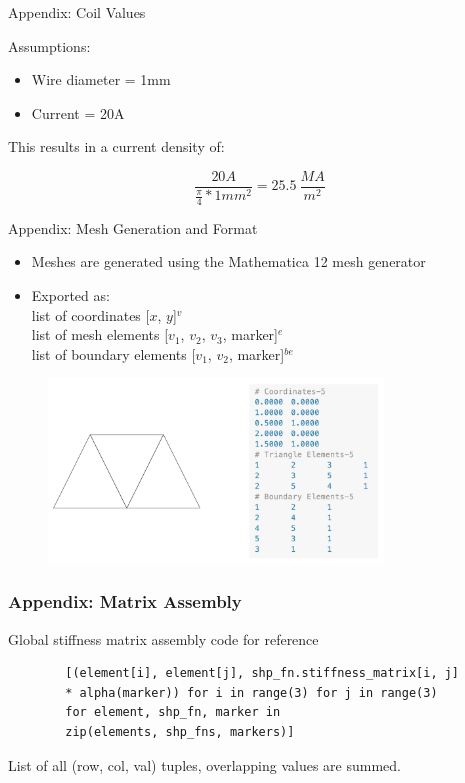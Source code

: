 \documentclass{beamer}
\begin{document}
        \begin{frame}{Appendix: Coil Values}
    
        Assumptions:
        \begin{itemize}
            \item Wire diameter = 1mm
            \item Current = 20A
        \end{itemize}
        \hspace{5pt} This results in a current density of:
        
        $$\frac{20A}{\frac{\pi}{4} * 1mm^2} = 25.5 \  \frac{MA}{m^2}$$
        
    \end{frame}
    
    \begin{frame}{Appendix: Mesh Generation and Format}
        \begin{itemize}
            \item Meshes are generated using the Mathematica 12 mesh generator
            \item Exported as:\\ list of coordinates [$x$, $y$]$^v$ \\list of mesh elements [$v_1$, $v_2$, $v_3$, marker]$^{e}$ \\list of boundary elements [$v_1$, $v_2$, marker]$^{be}$
        \end{itemize}


        \begin{figure}
            \centering
            \includegraphics[width=3.5in]{meshdemo.png}
        \end{figure}
    \end{frame}
    \begin{frame}[fragile]\frametitle{Appendix: Matrix Assembly}

        Global stiffness matrix assembly code for reference
        {
        \small
        \begin{verbatim}
        [(element[i], element[j], shp_fn.stiffness_matrix[i, j]
        * alpha(marker)) for i in range(3) for j in range(3)
        for element, shp_fn, marker in
        zip(elements, shp_fns, markers)]
        \end{verbatim}
        }
        List of all (row, col, val) tuples, overlapping values are summed.
    \end{frame}
    
\end{document}

